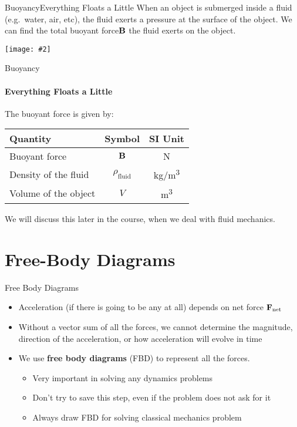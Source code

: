 \documentclass[12pt,compress,aspectratio=169]{beamer}
\newcommand{\pic}[2]{\texttt{[image: \#2]}}
\newcommand{\mb}[1]{\ensuremath\mathbf{#1}}
\newcommand{\eq}[2]{\vspace{#1}{\Large\begin{displaymath}#2\end{displaymath}}}
\begin{document}
\begin{frame}{Buoyancy}{Everything Floats a Little}
  When an object is submerged inside a fluid (e.g.\ water, air, etc), the fluid
  exerts a pressure at the surface of the object. We can find the total buoyant 
  force$\mb{B}$ the fluid exerts on the object.
  \begin{center}
    \pic{.25}{graphics/rock_fbvectors.png}
  \end{center}
\end{frame}



\begin{frame}{Buoyancy}
  \framesubtitle{Everything Floats a Little}
  The buoyant force is given by:
  
  \eq{-.1in}{
    \boxed{\mb{B}=\rho_\mathrm{fluid}gV\bm{\hat{k}}}
  }
  \begin{center}
    \begin{tabular}{l|c|c}
      \rowcolor{pink}
      \textbf{Quantity} & \textbf{Symbol} & \textbf{SI Unit} \\ \hline
      Buoyant force & $\mb{B}$  & \si{\newton} \\
      Density of the fluid & $\rho_\mathrm{fluid}$ & \si{\kg/\m^3}\\
      Volume of the object & $V$ & \si{\metre^3}
    \end{tabular}
  \end{center}
  We will discuss this later in the course, when we deal with fluid mechanics.
\end{frame}



\section{Free-Body Diagrams}


\begin{frame}{Free Body Diagrams}
  \begin{itemize}
  \item Acceleration (if there is going to be any at all) depends
    on net force $\mb{F}_\mathrm{net}$
  \item Without a vector sum of all the forces, we cannot determine the
    magnitude, direction of the acceleration, or how acceleration will evolve
    in time
  \item We use \textbf{free body diagrams} (FBD) to represent all the forces.
    \begin{itemize}
    \item Very important in solving any dynamics problems
    \item Don't try to save this step, even if the problem does not ask for it
    \item Always draw FBD for solving classical mechanics problem
    \end{itemize}
  \end{itemize}
\end{frame}
\end{document}

